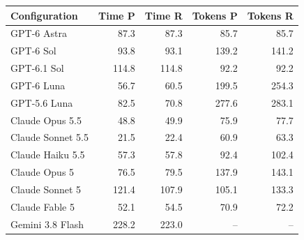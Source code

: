 \begin{tabular}{lrrrr}
\toprule
Configuration & Time P & Time R & Tokens P & Tokens R \\
\midrule
GPT-6 Astra & 87.3 & 87.3 & 85.7 & 85.7 \\
GPT-6 Sol & 93.8 & 93.1 & 139.2 & 141.2 \\
GPT-6.1 Sol & 114.8 & 114.8 & 92.2 & 92.2 \\
GPT-6 Luna & 56.7 & 60.5 & 199.5 & 254.3 \\
GPT-5.6 Luna & 82.5 & 70.8 & 277.6 & 283.1 \\
Claude Opus 5.5 & 48.8 & 49.9 & 75.9 & 77.7 \\
Claude Sonnet 5.5 & 21.5 & 22.4 & 60.9 & 63.3 \\
Claude Haiku 5.5 & 57.3 & 57.8 & 92.4 & 102.4 \\
Claude Opus 5 & 76.5 & 79.5 & 137.9 & 143.1 \\
Claude Sonnet 5 & 121.4 & 107.9 & 105.1 & 133.3 \\
Claude Fable 5 & 52.1 & 54.5 & 70.9 & 72.2 \\
Gemini 3.8 Flash & 228.2 & 223.0 & -- & -- \\
\bottomrule
\end{tabular}
